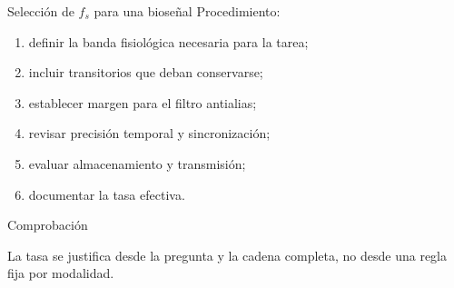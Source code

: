 \documentclass[
  10pt,
  ignorenonframetext,
  aspectratio=169,
  spanish,
]{beamer}
\providecommand{\tightlist}{%
  \setlength{\itemsep}{0pt}\setlength{\parskip}{0pt}}
\begin{document}
\begin{frame}{Selección de \(f_s\) para una bioseñal}
\label{d2-080}
Procedimiento:

\begin{enumerate}
\tightlist
\item
  definir la banda fisiológica necesaria para la tarea;
\item
  incluir transitorios que deban conservarse;
\item
  establecer margen para el filtro antialias;
\item
  revisar precisión temporal y sincronización;
\item
  evaluar almacenamiento y transmisión;
\item
  documentar la tasa efectiva.
\end{enumerate}

\begin{block}{Comprobación}

La tasa se justifica desde la pregunta y la cadena completa, no desde
una regla fija por modalidad.

\end{block}

\end{frame}
\end{document}
